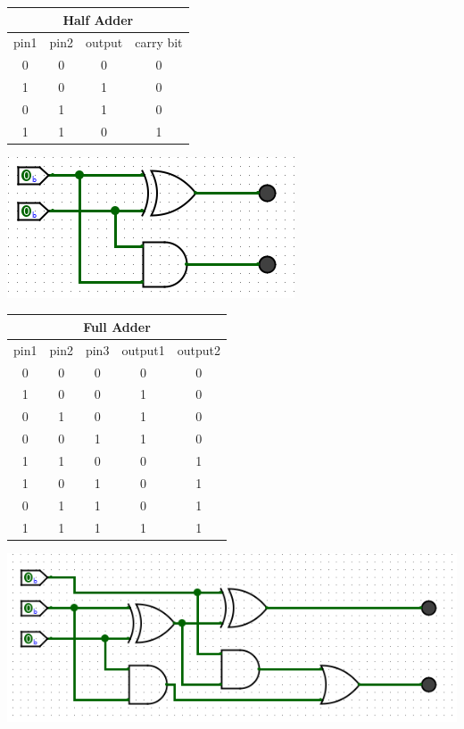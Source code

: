 \documentclass[12pt]{article}
\begin{document}
\clearpage

\begin{center}
    \begin{tabular}{|c|c|c|c|}
        \hline
        \multicolumn{4}{|c|}{Half Adder} \\
        \hline
        pin1 & pin2 & output & carry bit \\
        \hline\hline
        0 & 0 & 0 & 0 \\
        \hline
        1 & 0 & 1 & 0 \\
        \hline
        0 & 1 & 1 & 0 \\
        \hline
        1 & 1 & 0 & 1 \\
        \hline
    \end{tabular}
\end{center}
\centering\includegraphics[scale=0.5]{images/halfadder.png}

\begin{center}
    \begin{tabular}{|c|c|c|c|c|}
        \hline
        \multicolumn{5}{|c|}{Full Adder} \\
        \hline
        pin1 & pin2 & pin3 & output1 & output2 \\
        \hline\hline
        0 & 0 & 0 & 0 & 0 \\
        \hline
        1 & 0 & 0 & 1 & 0 \\
        \hline
        0 & 1 & 0 & 1 & 0 \\
        \hline
        0 & 0 & 1 & 1 & 0 \\
        \hline
        1 & 1 & 0 & 0 & 1 \\
        \hline
        1 & 0 & 1 & 0 & 1 \\
        \hline
        0 & 1 & 1 & 0 & 1 \\
        \hline
        1 & 1 & 1 & 1 & 1 \\
        \hline
    \end{tabular}
\end{center}
\centering\includegraphics[scale=0.5]{images/fulladder.png}
\end{document}
